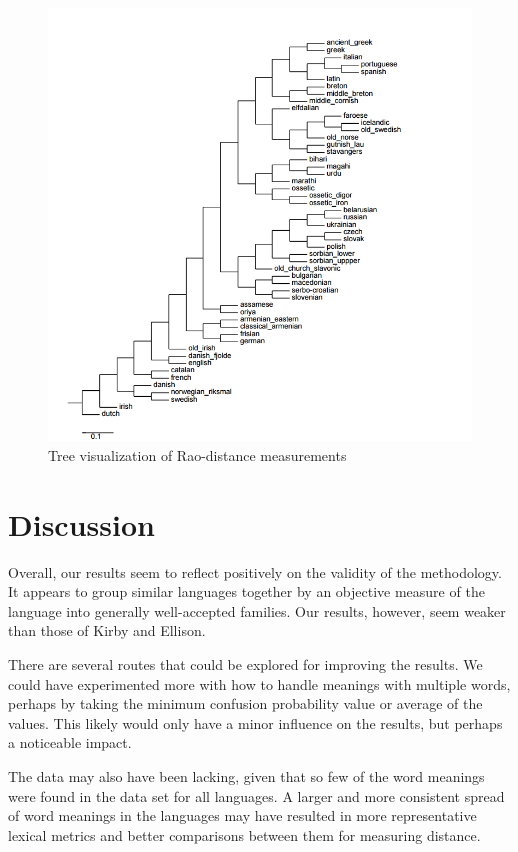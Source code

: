 \documentclass[10pt,a4]{article}
\begin{document}
\begin{figure}[ht]
	\centering
	\includegraphics[width=\linewidth]{tree2(2)}
	\caption{Tree visualization of Rao-distance measurements}
	\label{fig:raotree}
\end{figure}


\section{Discussion}

Overall, our results seem to reflect positively on the validity of the methodology.  It appears to group similar languages together by an objective measure of the language into generally well-accepted families.  Our results, however, seem weaker than those of Kirby and Ellison.

There are several routes that could be explored for improving the results.  We could have experimented more with how to handle meanings with multiple words, perhaps by taking the minimum confusion probability value or average of the values.  This likely would only have a minor influence on the results, but perhaps a noticeable impact.

The data may also have been lacking, given that so few of the word meanings were found in the data set for all languages.  A larger and more consistent spread of word meanings in the languages may have resulted in more representative lexical metrics and better comparisons between them for measuring distance.
\end{document}
